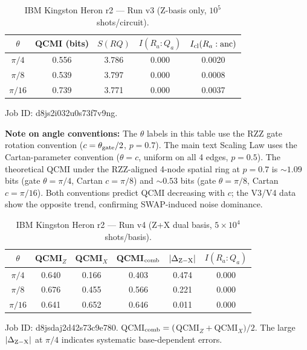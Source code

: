 \documentclass[aps,prl,superscriptaddress,nofootinbib]{revtex4-2}
\begin{document}
\begin{table}[ht]
\caption{IBM Kingston Heron r2 --- Run v3 (Z-basis only, $10^5$ shots/circuit).}
\label{tab:v3}
\begin{ruledtabular}
\begin{tabular}{ccccc}
$\theta$ & QCMI (bits) & $S(RQ)$ & $I(R_a:Q_a)$ & $I_{\rm cl}(R_a:\mathrm{anc})$ \\
\hline
$\pi/4$ & 0.556 & 3.786 & 0.000 & 0.0020 \\
$\pi/8$ & 0.539 & 3.797 & 0.000 & 0.0008 \\
$\pi/16$ & 0.739 & 3.771 & 0.000 & 0.0037 \\
\end{tabular}
\end{ruledtabular}

\vspace{4pt}
\noindent Job ID: d8js2i032u0s73f7v9ng.

\vspace{4pt}
\noindent\textbf{Note on angle conventions:} The $\theta$ labels in this table use the RZZ gate rotation convention ($c=\theta_{\rm gate}/2$, $p=0.7$). The main text Scaling Law uses the Cartan-parameter convention ($\theta=c$, uniform on all 4 edges, $p=0.5$). The theoretical QCMI under the RZZ-aligned 4-node spatial ring at $p=0.7$ is ${\sim}1.09$ bits (gate $\theta=\pi/4$, Cartan $c=\pi/8$) and ${\sim}0.53$ bits (gate $\theta=\pi/8$, Cartan $c=\pi/16$). Both conventions predict QCMI decreasing with $c$; the V3/V4 data show the opposite trend, confirming SWAP-induced noise dominance.
\end{table}

\begin{table}[ht]
\caption{IBM Kingston Heron r2 --- Run v4 (Z+X dual basis, $5\times10^4$ shots/basis).}
\label{tab:v4}
\begin{ruledtabular}
\begin{tabular}{cccccc}
$\theta$ & QCMI$_Z$ & QCMI$_X$ & QCMI$_{\rm comb}$ & $|\Delta_{\rm Z-X}|$ & $I(R_a:Q_a)$ \\
\hline
$\pi/4$ & 0.640 & 0.166 & 0.403 & 0.474 & 0.000 \\
$\pi/8$ & 0.676 & 0.455 & 0.566 & 0.221 & 0.000 \\
$\pi/16$ & 0.641 & 0.652 & 0.646 & 0.011 & 0.000 \\
\end{tabular}
\end{ruledtabular}

\vspace{4pt}
\noindent Job ID: d8jsdaj2d42s73c9e780. QCMI$_{\rm comb}=($QCMI$_Z+$QCMI$_X)/2$. The large $|\Delta_{\rm Z-X}|$ at $\pi/4$ indicates systematic base-dependent errors.
\end{table}
\end{document}
